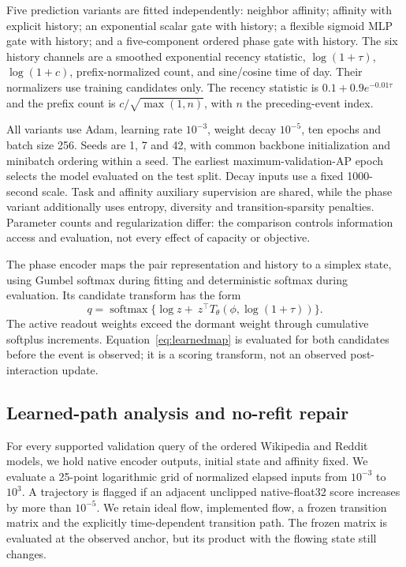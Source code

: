 \documentclass[pdflatex,sn-vancouver-num]{sn-jnl}
\theoremstyle{thmstyleone}
\begin{document}
Five prediction variants are fitted independently: neighbor affinity; affinity with explicit history; an exponential scalar gate with history; a flexible sigmoid MLP gate with history; and a five-component ordered phase gate with history. The six history channels are a smoothed exponential recency statistic, $\log(1+\tau)$, $\log(1+c)$, prefix-normalized count, and sine/cosine time of day. Their normalizers use training candidates only. The recency statistic is $0.1+0.9e^{-0.01\tau}$ and the prefix count is $c/\sqrt{\max(1,n)}$, with $n$ the preceding-event index.

All variants use Adam, learning rate $10^{-3}$, weight decay $10^{-5}$, ten epochs and batch size 256. Seeds are 1, 7 and 42, with common backbone initialization and minibatch ordering within a seed. The earliest maximum-validation-AP epoch selects the model evaluated on the test split. Decay inputs use a fixed 1000-second scale. Task and affinity auxiliary supervision are shared, while the phase variant additionally uses entropy, diversity and transition-sparsity penalties. Parameter counts and regularization differ: the comparison controls information access and evaluation, not every effect of capacity or objective.

The phase encoder maps the pair representation and history to a simplex state, using Gumbel softmax during fitting and deterministic softmax during evaluation. Its candidate transform has the form
\begin{equation}\label{eq:learnedmap}
q=\operatorname{softmax}\{\log z+\ z^\top T_\theta(\phi,\log(1+\tau))\}.
\end{equation}
The active readout weights exceed the dormant weight through cumulative softplus increments. Equation~\eqref{eq:learnedmap} is evaluated for both candidates before the event is observed; it is a scoring transform, not an observed post-interaction update.

\subsection{Learned-path analysis and no-refit repair}
For every supported validation query of the ordered Wikipedia and Reddit models, we hold native encoder outputs, initial state and affinity fixed. We evaluate a 25-point logarithmic grid of normalized elapsed inputs from $10^{-3}$ to $10^3$. A trajectory is flagged if an adjacent unclipped native-float32 score increases by more than $10^{-5}$. We retain ideal flow, implemented flow, a frozen transition matrix and the explicitly time-dependent transition path. The frozen matrix is evaluated at the observed anchor, but its product with the flowing state still changes.
\end{document}

